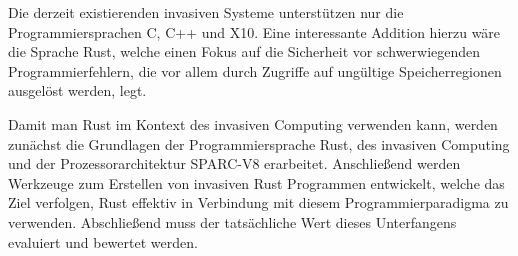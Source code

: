 Die derzeit existierenden invasiven Systeme unterstützen nur die Programmiersprachen C, C++ und X10.
Eine interessante Addition hierzu wäre die Sprache Rust,
welche einen Fokus auf die Sicherheit vor schwerwiegenden Programmierfehlern, die vor 
allem durch Zugriffe auf ungültige Speicherregionen ausgelöst werden, legt.

Damit man Rust im Kontext des invasiven Computing verwenden kann,
werden zunächst die Grundlagen der Programmiersprache Rust,
des invasiven Computing und der Prozessorarchitektur SPARC-V8 erarbeitet. 
Anschließend werden Werkzeuge zum Erstellen von invasiven
Rust Programmen entwickelt, welche das Ziel verfolgen,
Rust effektiv in Verbindung mit diesem Programmierparadigma zu verwenden.
Abschließend muss der tatsächliche Wert dieses Unterfangens evaluiert und bewertet werden.
